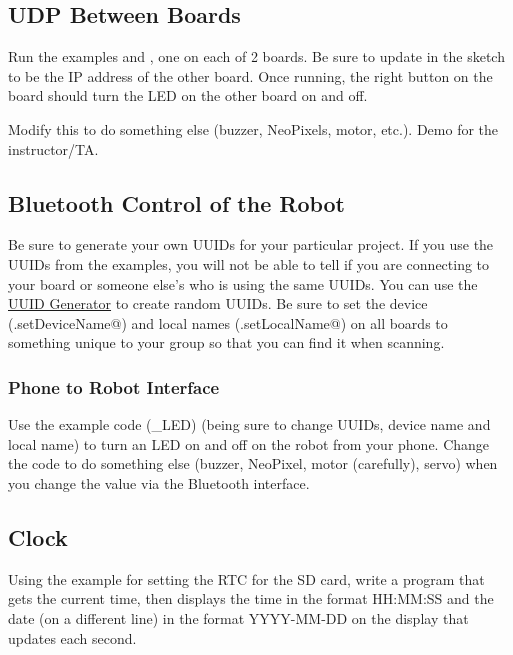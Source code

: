\subsection{UDP Between Boards}
Run the examples \lstinline@WiFiUdpSend@ and \lstinline@WiFiUdpReceiveSend@, one 
on each of 2 boards. Be sure to update \lstinline@remoteIp@ in the 
\lstinline@WiFiUdpSend@ sketch to be the IP address of the other board. Once 
running, the right button on the \lstinline@@ board should turn the LED on 
the other board on and off.

Modify this to do something else (buzzer, NeoPixels, motor, etc.). Demo for the 
instructor/TA.

\subsection{Bluetooth Control of the Robot}
Be sure to generate your own UUIDs for your particular project. If you use
the UUIDs from the examples, you will not be able to tell if you are connecting
to your board or someone else's who is using the same UUIDs. You can use the 
\href{https://www.uuidgenerator.net/}{UUID Generator} to create random UUIDs.
Be sure to set the device (\lstinline@BLE.setDeviceName@) and local names 
(\lstinline@BLE.setLocalName@) on all boards to something unique to 
your group so that you can find it when scanning.

\subsubsection{Phone to Robot Interface}
Use the example code (\lstinline@BLE_LED) (being sure to change UUIDs, device name and local name)
to turn an LED on and off on the robot from your phone. Change the code to 
do something else (buzzer, NeoPixel, motor (carefully), servo) when you change 
the value via the Bluetooth interface. 


\subsection{Clock}
Using the example for setting the RTC for the SD card, write a 
program that gets the current time, then displays the time in the 
format HH:MM:SS and the date (on a different line) in the format 
YYYY-MM-DD on the display that updates each second.

